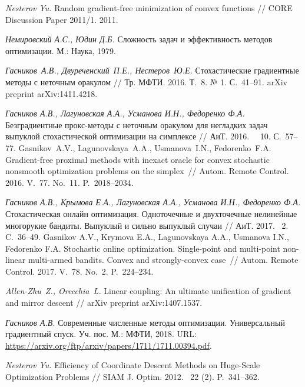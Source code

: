 \documentclass[11pt]{article}
\newcommand*{\No}{\textnumero}
\begin{document}
		
		\begin{thebibliography}{99}
		
		\textit{Nesterov Yu.}
		Random gradient-free minimization of convex functions // 
		CORE Discussion Paper 2011/1.  2011.

\textit{Немировский А.С., Юдин Д.Б.} Сложность задач и эффективность методов оптимизации. М.: Наука, 1979.

		
		\textit{Гасников~А.В., Двуреченский~П.Е., Нестеров~Ю.Е.}
		Стохастические градиентные методы с неточным оракулом // Тр. МФТИ. 2016. Т.~8. № 1. С.~41--91.
		arXiv preprint %
		arXiv:1411.4218.	
		
		 \textit{Гасников А.В., Лагуновская А.А., Усманова И.Н., Федоренко Ф.А.}  Безградиентные прокс-методы с неточным оракулом для негладких задач выпуклой стохастической оптимизации на симплексе // АиТ. 2016. \No~~10. С.~57--77.
Gasnikov~A.V., Lagunovskaya~A.A., Usmanova~I.N., Fedorenko~F.A.		 
Gradient-free proximal methods with inexact oracle for convex stochastic nonsmooth optimization problems on the simplex~//
 Autom. Remote Control. 2016.
 V.~77. No.~11. P.~2018--2034.
	 
		
		 
        \textit{Гасников А.В., Крымова Е.А., Лагуновская А.А., Усманова И.Н., Федоренко Ф.А.} Стохастическая онлайн оптимизация. Одноточечные и двухточечные нелинейные многорукие бандиты. Выпуклый и сильно выпуклый случаи // АиТ. 2017. \No~2. C.~36--49. 
Gasnikov A.V., Krymova E.A.,  Lagunovskaya A.A.,  Usmanova I.N.,  Fedorenko F.A.       
Stochastic online optimization. Single-point and multi-point non-linear multi-armed bandits. Convex and strongly-convex case~//
Autom. Remote Control. 2017.
V.~78. No.~2. P.~224--234.
		
		\textit{Allen-Zhu~Z., Orecchia~L.} %
		Linear coupling: An ultimate unification of gradient and mirror descent //
		arXiv preprint %
		arXiv:1407.1537.
		
		\textit{Гасников А.В.} Современные численные методы оптимизации.
Универсальный градиентный спуск.
Уч. пос. М.: МФТИ, 2018.
URL: \url{https://arxiv.org/ftp/arxiv/papers/1711/1711.00394.pdf}.

\textit{Nesterov Yu.} Efficiency of Coordinate Descent Methods on Huge-Scale Optimization Problems // 
SIAM J. Optim. 2012. \No~22 (2). P.~341--362. 
		

\end{thebibliography}
\end{document}
